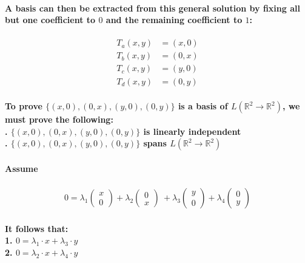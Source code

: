 \documentclass{article}
\begin{document}
\paragraph{\large
A basis can then be extracted from this general solution by fixing all but one coefficient to $0$ and the remaining coefficient to $1$:}

\begin{align*}
T_a(x, y) &= (x, 0)
\\T_b(x, y) &= (0, x)
\\T_c(x, y) &= (y, 0)
\\T_d(x, y) &= (0, y)
\end{align*}

\paragraph{\large
To prove $\{(x, 0), (0, x), (y, 0), (0, y)\}$ is a basis of $L(\mathbb{R}^2 \rightarrow \mathbb{R}^2)$, we must prove the following:
\\. $\{(x, 0), (0, x), (y, 0), (0, y)\}$ is linearly independent
\\. $\{(x, 0), (0, x), (y, 0), (0, y)\}$ spans $L(\mathbb{R}^2 \rightarrow \mathbb{R}^2)$}

\paragraph{\large
Assume
}
\begin{align*}
0 = \lambda_1
\begin{pmatrix}
    x \\ 0
\end{pmatrix}
+ \lambda_2
\begin{pmatrix}
    0 \\ x
\end{pmatrix}\
+ \lambda_3
\begin{pmatrix}
    y \\ 0
\end{pmatrix}
+ \lambda_4
\begin{pmatrix}
    0 \\ y
\end{pmatrix}
\end{align*}

\paragraph{\large
It follows that:
\\1. $0 = \lambda_1 \cdot x + \lambda_3 \cdot y$
\\2. $0 = \lambda_2 \cdot x + \lambda_4 \cdot y$}
\end{document}
